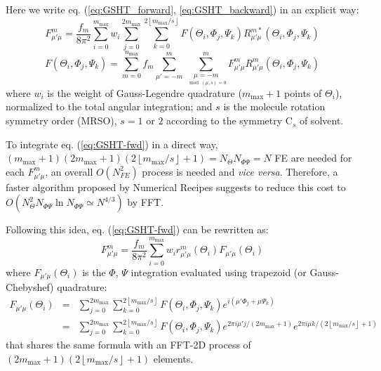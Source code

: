 Here we write eq. (\ref{eq:GSHT_forward}, \ref{eq:GSHT_backward})
in an explicit way:
\begin{equation}
F_{\mu'\mu}^{m}=\frac{f_{m}}{8\pi^{2}}\sum_{i=0}^{m_{\mathrm{max}}}w_{i}\sum_{j=0}^{2m_{\mathrm{max}}}\sum_{k=0}^{2\left\lfloor m_{\mathrm{max}}/s\right\rfloor }F(\Theta_{i},\Phi_{j},\Psi_{k})R_{\mu'\mu}^{m*}(\Theta_{i},\Phi_{j},\Psi_{k})\label{eq:GSHT-fwd}
\end{equation}
\begin{equation}
F(\Theta_{i},\Phi_{j},\Psi_{k})=\sum_{m=0}^{n_{\mathrm{max}}}f_{m}\sum_{\mu'=-m}^{m}\sum_{\underset{\mod(\mu,s)=0}{\mu=-m}}^{m}F_{\mu'\mu}^{m}R_{\mu'\mu}^{m}(\Theta_{i},\Phi_{j},\Psi_{k})\label{eq:GSHT-bwd}
\end{equation}
where $w_{i}$ is the weight of Gauss-Legendre quadrature ($m_{\mathrm{max}}+1$
points of $\Theta_{i}$), normalized to the total angular integration;
and $s$ is the molecule rotation symmetry order (\acs{MRSO}), $s=1$
or $2$ according to the symmetry $\mathrm{C}_{s}$ of solvent.

To integrate eq. (\ref{eq:GSHT-fwd}) in a direct way, $(m_{\mathrm{max}}+1)(2m_{\mathrm{max}}+1)(2\left\lfloor m_{\mathrm{max}}/s\right\rfloor +1)=N_{\Theta}N_{\Phi\Psi}=N$
\acs{FE} are needed for each $F_{\mu'\mu}^{m}$, an overall $O(N_{FE}^{2})$
process is needed and \textit{vice versa}. Therefore, a faster algorithm
proposed by Numerical Recipes \citep{Numerical_Recipes_3ed} suggests
to reduce this cost to $O(N_{\Theta}^{2}N_{\Phi\Psi}\ln N_{\Phi\Psi}\simeq N^{4/3})$
by \acs{FFT}.

Following this idea, eq. (\ref{eq:GSHT-fwd}) can be rewritten as:
\begin{equation}
F_{\mu'\mu}^{m}=\frac{f_{m}}{8\pi^{2}}\sum_{i=0}^{m_{\mathrm{max}}}w_{i}r_{\mu'\mu}^{m}(\Theta_{i})F_{\mu'\mu}(\Theta_{i})
\end{equation}
where $F_{\mu'\mu}(\Theta_{i})$ is the $\Phi$, $\Psi$ integration
evaluated using trapezoid (or Gauss-Chebyshef) quadrature:
\begin{eqnarray}
F_{\mu'\mu}(\Theta_{i}) & = & \sum_{j=0}^{2m_{\mathrm{max}}}\sum_{k=0}^{2\left\lfloor m_{\mathrm{max}}/s\right\rfloor }F(\Theta_{i},\Phi_{j},\Psi_{k})e^{i(\mu'\Phi_{j}+\mu\Psi_{k})}\label{eq:f_mup_mu}\\
 & = & \sum_{j=0}^{2m_{\mathrm{max}}}\sum_{k=0}^{2\left\lfloor m_{\mathrm{max}}/s\right\rfloor }F(\Theta_{i},\Phi_{j},\Psi_{k})e^{2\pi i\mu'j/(2m_{\mathrm{max}}+1)}e^{2\pi i\mu k/(2\left\lfloor m_{\mathrm{max}}/s\right\rfloor +1)}\nonumber 
\end{eqnarray}
that shares the same formula with an \acs{FFT}-2D process of $\left(2m_{\mathrm{max}}+1\right)\left(2\left\lfloor m_{\mathrm{max}}/s\right\rfloor +1\right)$
elements.

